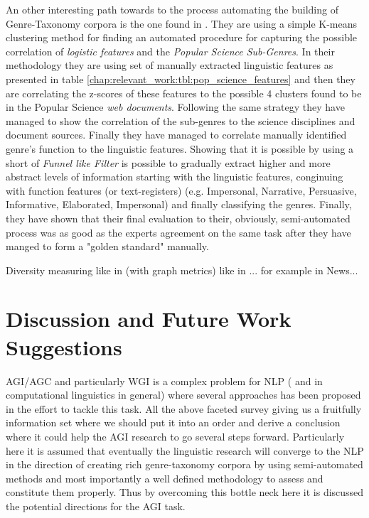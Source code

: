 An other interesting path towards to the process automating the building of Genre-Taxonomy corpora is the one found in \parencite{lieungnapar2017genre}. They are using a simple K-means clustering method for finding an automated procedure for capturing the possible correlation of \textit{logistic features} and the \textit{Popular Science Sub-Genres}. In their methodology they are using set of manually extracted linguistic features as presented in table \ref{chap:relevant_work:tbl:pop_science_features} and then they are correlating the z-scores of these features to the possible 4 clusters found to be in the Popular Science \textit{web documents}. Following the same strategy they have managed to show the correlation of the sub-genres to the science disciplines and document sources. Finally they have managed to correlate manually identified genre's function to the linguistic features. Showing that it is possible by using a short of \textit{Funnel like Filter} is possible to gradually extract higher and more abstract levels of information starting with the linguistic features, conginuing with function features (or text-registers) (e.g. Impersonal, Narrative, Persuasive, Informative, Elaborated, Impersonal) and finally classifying the genres. Finally, they have shown that their final evaluation to their, obviously, semi-automated process was as good as the experts agreement on the same task after they have manged to form a "golden standard" manually. 

Diversity measuring like in (with graph metrics) like in \parencite{nabhan2016graph}... for example in News... 


\section{Discussion and Future Work Suggestions}\label{chap:relevant_work:sec:intro}

AGI/AGC and particularly WGI is a complex problem for NLP ( and in computational linguistics in general) where several approaches has been proposed in the effort to tackle this task. All the above faceted survey giving us a fruitfully information set where we should put it into an order and derive a conclusion where it could help the AGI research to go several steps forward. Particularly here it is assumed that eventually the linguistic research will converge to the NLP in the direction of creating rich genre-taxonomy corpora by using semi-automated methods and most importantly a well defined methodology to assess and constitute them properly. Thus by overcoming this bottle neck here it is discussed the potential directions for the AGI task.

